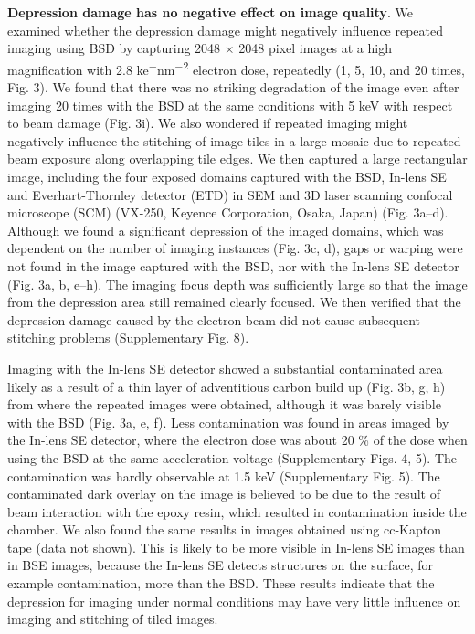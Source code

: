 \documentclass{article}
\begin{document}
\textbf{Depression damage has no negative effect on image quality}. We examined whether the depression damage might negatively influence repeated imaging using BSD by capturing 2048 × 2048 pixel images at a high magnification with 2.8 ke\textsuperscript{−}nm\textsuperscript{−2} electron dose, repeatedly (1, 5, 10, and 20 times, Fig. 3). We found that there was no striking degradation of the image even after imaging 20 times with the BSD at the same conditions with 5 keV with respect to beam damage (Fig. 3i). We also wondered if repeated imaging might negatively influence the stitching of image tiles in a large mosaic due to repeated beam exposure along overlapping tile edges. We then captured a large rectangular image, including the four exposed domains captured with the BSD, In-lens SE and Everhart-Thornley detector (ETD) in SEM and 3D laser scanning confocal microscope (SCM) (VX-250, Keyence Corporation, Osaka, Japan) (Fig. 3a–d). Although we found a significant depression of the imaged domains, which was dependent on the number of imaging instances (Fig. 3c, d), gaps or warping were not found in the image captured with the BSD, nor with the In-lens SE detector (Fig. 3a, b, e–h). The imaging focus depth was sufficiently large so that the image from the depression area still remained clearly focused. We then verified that the depression damage caused by the electron beam did not cause subsequent stitching problems (Supplementary Fig. 8).

Imaging with the In-lens SE detector showed a substantial contaminated area likely as a result of a thin layer of adventitious carbon build up (Fig. 3b, g, h) from where the repeated images were obtained, although it was barely visible with the BSD (Fig. 3a, e, f). Less contamination was found in areas imaged by the In-lens SE detector, where the electron dose was about 20 \% of the dose when using the BSD at the same acceleration voltage (Supplementary Figs. 4, 5). The contamination was hardly observable at 1.5 keV (Supplementary Fig. 5). The contaminated dark overlay on the image is believed to be due to the result of beam interaction with the epoxy resin, which resulted in contamination inside the chamber. We also found the same results in images obtained using cc-Kapton tape (data not shown). This is likely to be more visible in In-lens SE images than in BSE images, because the In-lens SE detects structures on the surface, for example contamination, more than the BSD. These results indicate that the depression for imaging under normal conditions may have very little influence on imaging and stitching of tiled images.
\end{document}
